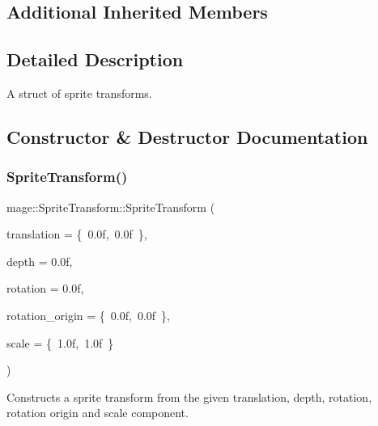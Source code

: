 \subsection*{Additional Inherited Members}


\subsection{Detailed Description}
A struct of sprite transforms. 

\subsection{Constructor \& Destructor Documentation}
\hypertarget{structmage_1_1_sprite_transform_ad7db5e256ed616138a288160f3a9c225}{}\label{structmage_1_1_sprite_transform_ad7db5e256ed616138a288160f3a9c225} 
\subsubsection{\texorpdfstring{Sprite\+Transform()}{SpriteTransform()}\hspace{0.1cm}{\footnotesize\ttfamily [1/4]}}
{\footnotesize\ttfamily mage\+::\+Sprite\+Transform\+::\+Sprite\+Transform (\begin{DoxyParamCaption}\item[{const X\+M\+F\+L\+O\+A\+T2 \&}]{translation = {\ttfamily \{~0.0f,~0.0f~\}},  }\item[{\hyperlink{namespacemage_a6a44ad388483959dc4dff9f2aef91431}{f32}}]{depth = {\ttfamily 0.0f},  }\item[{\hyperlink{namespacemage_a6a44ad388483959dc4dff9f2aef91431}{f32}}]{rotation = {\ttfamily 0.0f},  }\item[{const X\+M\+F\+L\+O\+A\+T2 \&}]{rotation\+\_\+origin = {\ttfamily \{~0.0f,~0.0f~\}},  }\item[{const X\+M\+F\+L\+O\+A\+T2 \&}]{scale = {\ttfamily \{~1.0f,~1.0f~\}} }\end{DoxyParamCaption})\hspace{0.3cm}{\ttfamily [explicit]}}

Constructs a sprite transform from the given translation, depth, rotation, rotation origin and scale component.


